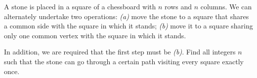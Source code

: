 A stone is placed in a square of a chessboard with $n$ rows and $n$ columns. We can alternately undertake two operations:
\textit{(a)} move the stone to a square that shares a common side with the square in which it stands;
\textit{(b)} move it to a square sharing only one common vertex with the square in which it stands.

In addition, we are required that the first step must be \textit{(b)}. Find all integers $n$ such that the stone can go through a certain path visiting every square exactly once.